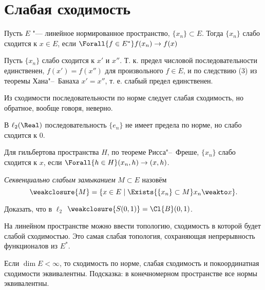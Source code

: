 \documentclass[main]{subfiles}
\begin{document}
\section{Слабая сходимость} %

\begin{definition}
  Пусть \( E \) "--- линейное нормированное пространство, \( \{ x_n \} \subset E \). Тогда 
  \( \{ x_n \} \) слабо сходится к \( x \in E \), если
  \( \Forall{f \in E^*} f(x_n) \to f(x) \)
\end{definition}

\begin{remark}
  Пусть $\{ x_n \}$ слабо сходится к $x'$ и $x''$.
  Т. к. предел числовой последовательности единственен,
  $f(x') = f(x'')$ для произвольного $f \in E$, и по следствию
  (3) из теоремы Хана"--~Банаха $x' = x''$,
  т. е. слабый предел единственен.
\end{remark}

\begin{remark}
  Из сходимости последовательности по норме следует слабая
  сходимость, но обратное, вообще говоря, неверно.
\end{remark}
\begin{example}
  В \( \ell_2(\Real) \) последовательность \( \{ e_n \} \)
  не имеет предела по норме, но слабо сходится к \( 0 \).
\end{example}

\begin{remark}
  Для гильбертова пространства \( H \),
  по теореме Рисса"--~Фреше, \( \{ x_n \} \)
  слабо сходится к \( x \), если \( \Forall{h \in H}
  (x_n, h) \to (x, h) \).
\end{remark}

\begin{definition}
  \emph{Секвенциально слабым замыканием} $M \subset E$ назовём
  \[ \weakclosure{M} = \{ x \in E \mid \Exists{ \{ x_n \} \subset M } x_n \weakto x \}. \]
\end{definition}

\begin{exercise}
  Доказать, что в \( \ell_2 \) \( \weakclosure{S(0, 1)} = \Cl{B}(0, 1) \).
\end{exercise}

На линейном пространстве можно ввести топологию,
сходимость в которой будет слабой сходимостью.
Это самая слабая топология,
сохраняющая непрерывность функционалов из $E^*$.

\begin{exercise}
  Если $\dim E < \infty$, то сходимость по норме, слабая сходимость
  и покоординатная сходимости эквивалентны.
  Подсказка: в конечномерном пространстве все нормы эквивалентны.
\end{exercise}
\end{document}
